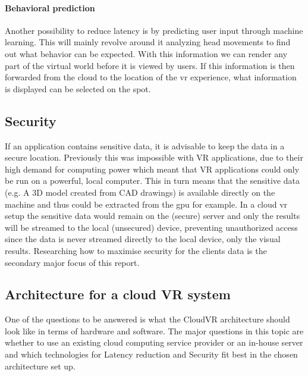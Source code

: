 \paragraph{Behavioral prediction}
Another possibility to reduce latency is by predicting
user input through machine learning. This will mainly revolve around it
analyzing head movements to find out what behavior can be expected. With
this information we can render any part of the virtual world before it
is viewed by users. If this information is then forwarded from the
cloud to the location of the \acrshort{vr} experience, what information is displayed can be selected on the spot.

\subsection{Security}
If an application contains sensitive data, it is advisable to keep the data in a secure location. Previously this was impossible with VR applications, due to their high demand for computing power which meant that VR applications could only be run on a powerful, local computer. This in turn means that the sensitive data (e.g. A 3D model created from CAD drawings) is available directly on the machine and thus could be extracted from the \acrshort{gpu} for example. In a cloud \acrshort{vr} setup the sensitive data would remain on the (secure) server and only the results will be streamed to the local (unsecured) device, preventing unauthorized access since the data is never streamed directly to the local device, only the visual results. Researching how to maximise security for the clients data is the secondary major focus of this report.

\subsection{Architecture for a cloud VR system}
One of the questions to be answered is what the CloudVR architecture should look like
in terms of hardware and software. The major questions in this topic are whether to use an existing cloud computing service provider or an in-house server and which technologies for Latency reduction and Security fit best in the chosen architecture set up.